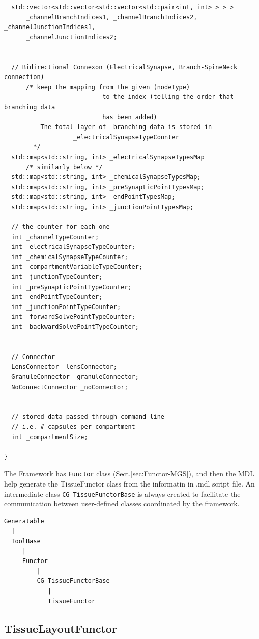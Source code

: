 {\begin{lstlisting}
  std::vector<std::vector<std::vector<std::pair<int, int> > > >
      _channelBranchIndices1, _channelBranchIndices2, _channelJunctionIndices1,
      _channelJunctionIndices2;


  // Bidirectional Connexon (ElectricalSynapse, Branch-SpineNeck connection)
      /* keep the mapping from the given (nodeType) 
                           to the index (telling the order that branching data
                           has been added)
          The total layer of  branching data is stored in
                   _electricalSynapseTypeCounter
        */
  std::map<std::string, int> _electricalSynapseTypesMap
      /* similarly below */  
  std::map<std::string, int> _chemicalSynapseTypesMap;
  std::map<std::string, int> _preSynapticPointTypesMap;
  std::map<std::string, int> _endPointTypesMap;
  std::map<std::string, int> _junctionPointTypesMap;
    
  // the counter for each one
  int _channelTypeCounter;
  int _electricalSynapseTypeCounter;
  int _chemicalSynapseTypeCounter;
  int _compartmentVariableTypeCounter;
  int _junctionTypeCounter;
  int _preSynapticPointTypeCounter;
  int _endPointTypeCounter;
  int _junctionPointTypeCounter;
  int _forwardSolvePointTypeCounter;
  int _backwardSolvePointTypeCounter;
  
  
  // Connector 
  LensConnector _lensConnector;
  GranuleConnector _granuleConnector;
  NoConnectConnector _noConnector;

  
  // stored data passed through command-line
  // i.e. # capsules per compartment
  int _compartmentSize;
  
}
\end{lstlisting}
}


The Framework has \verb!Functor! class (Sect.\ref{sec:Functor-MGS}), and then the
MDL help generate the TissueFunctor class from the informatin in .mdl script
file. An intermediate class \verb!CG_TissueFunctorBase! is always created to
facilitate the communication between user-defined classes coordinated by the
framework.
\begin{verbatim}
Generatable
  |
  ToolBase
     |
     Functor
         |
         CG_TissueFunctorBase
            |
            TissueFunctor    
\end{verbatim}



\subsection{TissueLayoutFunctor}

